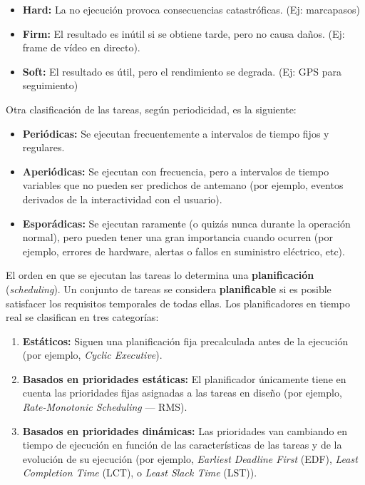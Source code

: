 \documentclass[../main.tex]{subfiles}
\begin{document}
        \begin{itemize}
            \item \textbf{Hard:} La no ejecución provoca consecuencias catastróficas. (Ej: marcapasos)
            \item \textbf{Firm:} El resultado es inútil si se obtiene tarde, pero no causa daños. (Ej: frame de vídeo en directo).
            \item \textbf{Soft:} El resultado es útil, pero el rendimiento se degrada. (Ej: GPS para seguimiento)
        \end{itemize}

        Otra clasificación de las tareas, según periodicidad, es la siguiente:
        \begin{itemize}
            \item \textbf{Periódicas:} Se ejecutan frecuentemente a intervalos de tiempo fijos y regulares.
            \item \textbf{Aperiódicas:} Se ejecutan con frecuencia, pero a intervalos de tiempo variables que no pueden ser predichos de antemano (por ejemplo, eventos derivados de la interactividad con el usuario).
            \item \textbf{Esporádicas:} Se ejecutan raramente (o quizás nunca durante la operación normal), pero pueden tener una gran importancia cuando ocurren (por ejemplo, errores de hardware, alertas o fallos en suministro eléctrico, etc).
        \end{itemize}

        El orden en que se ejecutan las tareas lo determina una \textbf{planificación} (\textit{scheduling}). Un conjunto de tareas se considera \textbf{planificable} si es posible satisfacer los requisitos temporales de todas ellas. Los planificadores en tiempo real se clasifican en tres categorías:

        \begin{enumerate}
            \item \textbf{Estáticos:} Siguen una planificación fija precalculada antes de la ejecución (por ejemplo, \textit{Cyclic Executive}).
            \item \textbf{Basados en prioridades estáticas:} El planificador únicamente tiene en cuenta las prioridades fijas asignadas a las tareas en diseño (por ejemplo, \textit{Rate-Monotonic Scheduling} --- RMS).
            \item \textbf{Basados en prioridades dinámicas:} Las prioridades van cambiando en tiempo de ejecución en función de las características de las tareas y de la evolución de su ejecución (por ejemplo, \textit{Earliest Deadline First} (EDF), \textit{Least Completion Time} (LCT), o \textit{Least Slack Time} (LST)).
        \end{enumerate}
\end{document}
